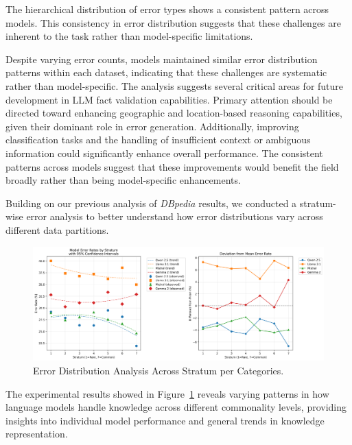 The hierarchical distribution of error types shows a consistent pattern across models.
This consistency in error distribution suggests that these challenges are inherent to the task rather than model-specific limitations.

Despite varying error counts, models maintained similar error distribution patterns within each dataset, indicating that these challenges are systematic rather than model-specific.
The analysis suggests several critical areas for future development in LLM fact validation capabilities.
Primary attention should be directed toward enhancing geographic and location-based reasoning capabilities, given their dominant role in error generation.
Additionally, improving classification tasks and the handling of insufficient context or ambiguous information could significantly enhance overall performance.
The consistent patterns across models suggest that these improvements would benefit the field broadly rather than being model-specific enhancements.

Building on our previous analysis of \textit{DBpedia} results, we conducted a stratum-wise error analysis to better understand how error distributions vary across different data partitions.
\begin{figure}[ht!]
    \centering
    \begin{minipage}[b]{\textwidth}
        \centering
        \includegraphics[width=\textwidth]{res/error_model-comparison_partition-wise}
    \end{minipage}
    \caption{Error Distribution Analysis Across Stratum per Categories.}
    \label{fig:error_model-comparison_partition-wise.png}
\end{figure}

The experimental results showed in Figure~\ref{fig:error_model-comparison_partition-wise.png} reveals varying patterns in how language models handle knowledge across different commonality levels, providing insights into individual model performance and general trends in knowledge representation.

